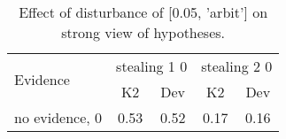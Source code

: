 \begin{table}\begin{tabular}{l|cc|cc}\toprule\multirow{2}{*}{Evidence} & \multicolumn{2}{c}{stealing 1 0}& \multicolumn{2}{c}{stealing 2 0}\\& {K2} & {Dev}& {K2} & {Dev}\\\midrule
no evidence, 0 & 0.53&0.52&0.17&0.16\\\bottomrule\end{tabular}\caption{Effect of disturbance of [0.05, 'arbit'] on strong view of hypotheses.}\end{table}